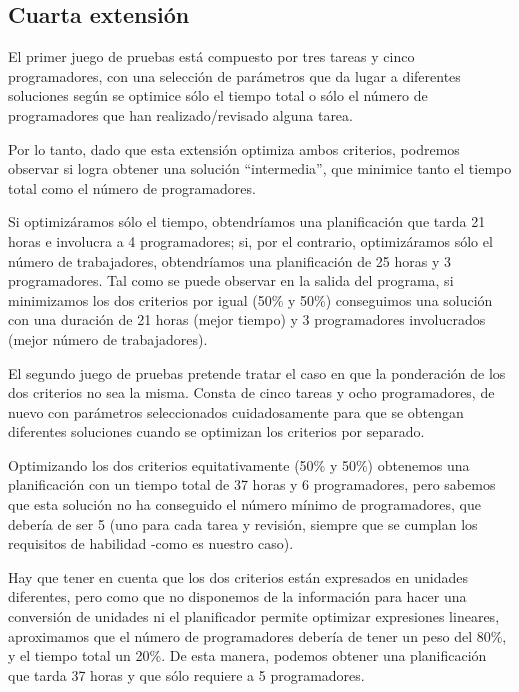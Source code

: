 
\subsection{Cuarta extensión} \label{sec:res-ext4}


El primer juego de pruebas está compuesto por tres tareas y cinco 
programadores, con una selección de parámetros que da lugar a diferentes 
soluciones según se optimice sólo el tiempo total o sólo el número de 
programadores que han realizado/revisado alguna tarea. 

Por lo tanto, dado que esta extensión optimiza ambos criterios, podremos 
observar si logra obtener una solución ``intermedia'', que minimice tanto el 
tiempo total como el número de programadores.




Si optimizáramos sólo el tiempo, obtendríamos una planificación que tarda 21 
horas e involucra a 4 programadores; si, por el contrario, optimizáramos sólo 
el número de trabajadores, obtendríamos una planificación de 25 horas y 3 
programadores. Tal como se puede observar en la salida del programa, si 
minimizamos los dos criterios por igual (50\% y 50\%) conseguimos una solución 
con una duración de 21 horas (mejor tiempo) y 3 programadores involucrados 
(mejor número de trabajadores).



El segundo juego de pruebas pretende tratar el caso en que la ponderación de 
los dos criterios no sea la misma. Consta de cinco tareas y ocho 
programadores, de nuevo con parámetros seleccionados cuidadosamente para que se
obtengan diferentes soluciones cuando se optimizan los criterios por separado.

Optimizando los dos criterios equitativamente (50\% y 50\%) obtenemos una 
planificación con un tiempo total de 37 horas y 6 programadores, pero sabemos 
que esta solución no ha conseguido el número mínimo de programadores, que 
debería de ser 5 (uno para cada tarea y revisión, siempre que se cumplan los 
requisitos de habilidad -como es nuestro caso).

Hay que tener en cuenta que los dos criterios están expresados en unidades 
diferentes, pero como que no disponemos de la información para hacer una 
conversión de unidades ni el planificador permite optimizar expresiones 
lineares, aproximamos que el número de programadores debería de tener un peso 
del 80\%, y el tiempo total un 20\%. De esta manera, podemos obtener una 
planificación que tarda 37 horas y que sólo requiere a 5 programadores.
